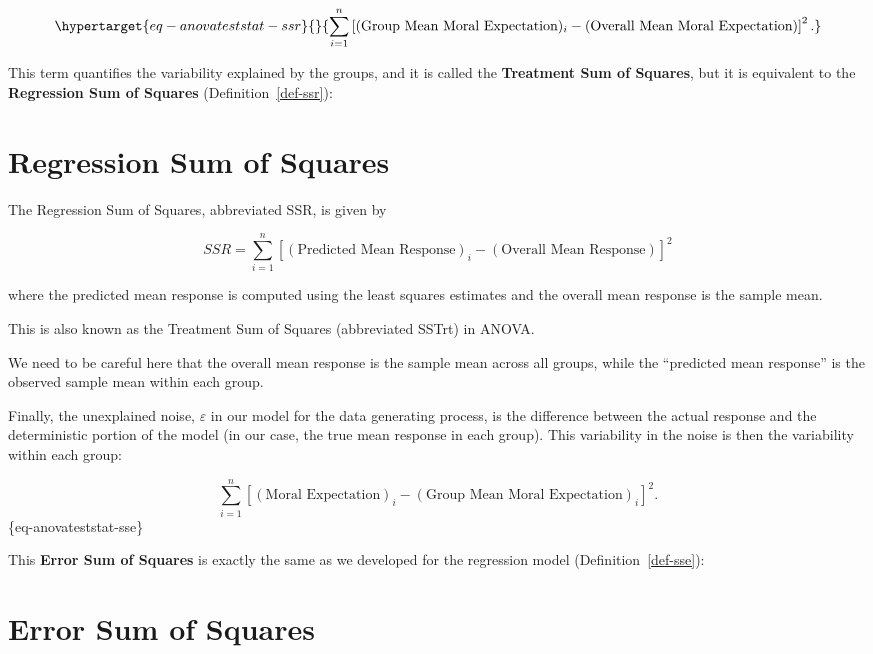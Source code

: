 \documentclass[
  letterpaper,
  DIV=11,
  numbers=noendperiod]{scrreprt}
\theoremstyle{plain}
\theoremstyle{definition}
\theoremstyle{definition}
\theoremstyle{remark}
\begin{document}
\begin{equation}\protect\hypertarget{eq-anovateststat-ssr}{}{\sum_{i=1}^{n} \left[(\text{Group Mean Moral Expectation})_i - (\text{Overall Mean Moral Expectation})\right]^2.}\label{eq-anovateststat-ssr}\end{equation}

This term quantifies the variability explained by the groups, and it is
called the \textbf{Treatment Sum of Squares}, but it is equivalent to
the \textbf{Regression Sum of Squares} (Definition~\ref{def-ssr}):

\hypertarget{regression-sum-of-squares-1}{%
\section{Regression Sum of Squares}\label{regression-sum-of-squares-1}}

The Regression Sum of Squares, abbreviated SSR, is given by

\[SSR = \sum_{i=1}^{n} \left[(\text{Predicted Mean Response})_i - (\text{Overall Mean Response})\right]^2\]

where the predicted mean response is computed using the least squares
estimates and the overall mean response is the sample mean.

This is also known as the Treatment Sum of Squares (abbreviated SSTrt)
in ANOVA.

We need to be careful here that the overall mean response is the sample
mean across all groups, while the ``predicted mean response'' is the
observed sample mean within each group.

Finally, the unexplained noise, \(\varepsilon\) in our model for the
data generating process, is the difference between the actual response
and the deterministic portion of the model (in our case, the true mean
response in each group). This variability in the noise is then the
variability within each group:

\[\sum_{i=1}^{n} \left[(\text{Moral Expectation})_i - (\text{Group Mean Moral Expectation})_i\right]^2.\]
\{eq-anovateststat-sse\}

This \textbf{Error Sum of Squares} is exactly the same as we developed
for the regression model (Definition~\ref{def-sse}):

\hypertarget{error-sum-of-squares-1}{%
\section{Error Sum of Squares}\label{error-sum-of-squares-1}}
\end{document}
